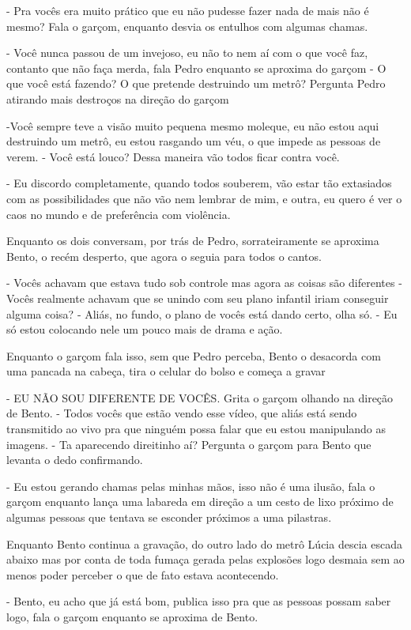 - Pra vocês era muito prático que eu não pudesse fazer nada de mais não é mesmo? Fala o garçom, enquanto desvia os entulhos com algumas chamas. 

- Você nunca passou de um invejoso, eu não to nem aí com o que você faz, contanto que não faça merda, fala Pedro enquanto se aproxima do garçom - O que você está fazendo? O que pretende destruindo um metrô? Pergunta Pedro atirando mais destroços na direção do garçom

-Você sempre teve a visão muito pequena mesmo moleque, eu não estou aqui destruindo um metrô, eu estou rasgando um véu, o que impede as pessoas de verem.
- Você está louco? Dessa maneira vão todos ficar contra você.

- Eu discordo completamente, quando todos souberem, vão estar tão extasiados com as possibilidades que não vão nem lembrar de mim, e outra, eu quero é ver o caos no mundo e de preferência com violência.


Enquanto os dois conversam, por trás de Pedro, sorrateiramente se aproxima Bento, o recém desperto, que agora o seguia para todos o cantos.

- Vocês achavam que estava tudo sob controle mas agora as coisas são diferentes - Vocês realmente achavam que se unindo com seu plano infantil iriam conseguir alguma coisa? - Aliás, no fundo, o plano de vocês está dando certo, olha só. - Eu só estou colocando nele um pouco mais de drama e ação.


Enquanto o garçom fala isso, sem que Pedro perceba, Bento o desacorda com uma pancada na cabeça, tira o celular do bolso e começa a gravar

- EU NÃO SOU DIFERENTE DE VOCÊS. Grita o garçom olhando na direção de Bento. - Todos vocês que estão vendo esse vídeo, que aliás está sendo transmitido ao vivo pra que ninguém possa falar que eu estou manipulando as imagens. - Ta aparecendo direitinho aí? Pergunta o garçom para Bento que levanta o dedo confirmando.


- Eu estou gerando chamas pelas minhas mãos, isso não é uma ilusão, fala o garçom enquanto lança uma labareda em direção a um cesto de lixo próximo de algumas pessoas que tentava se esconder próximos a uma pilastras.


Enquanto Bento continua a gravação, do outro lado do metrô Lúcia descia escada abaixo mas por conta de toda fumaça gerada pelas explosões logo desmaia sem ao menos poder perceber o que de fato estava acontecendo.

- Bento, eu acho que já está bom, publica isso pra que as pessoas possam saber logo, fala o garçom enquanto se aproxima de Bento.

